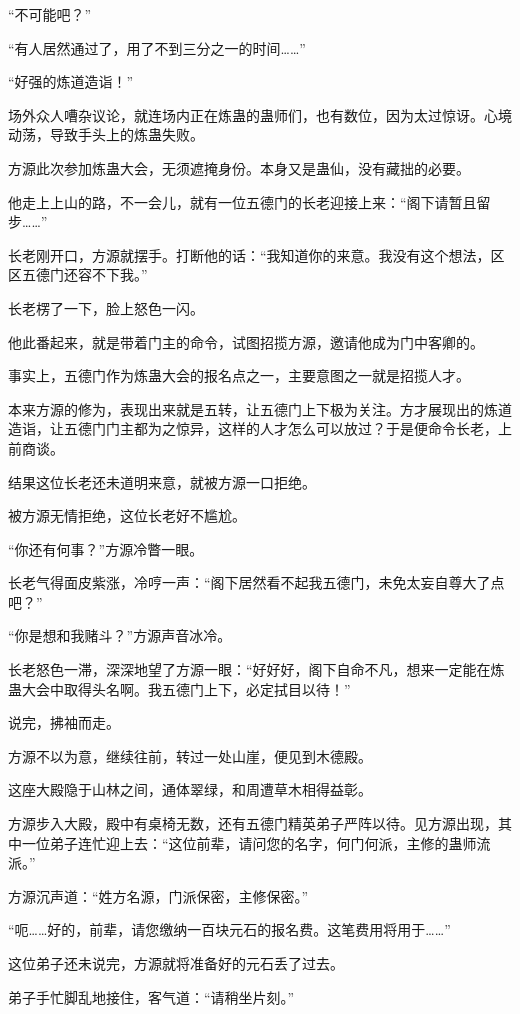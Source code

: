 \begin{this_body}
“不可能吧？”

“有人居然通过了，用了不到三分之一的时间……”

“好强的炼道造诣！”

场外众人嘈杂议论，就连场内正在炼蛊的蛊师们，也有数位，因为太过惊讶。心境动荡，导致手头上的炼蛊失败。

方源此次参加炼蛊大会，无须遮掩身份。本身又是蛊仙，没有藏拙的必要。

他走上上山的路，不一会儿，就有一位五德门的长老迎接上来：“阁下请暂且留步……”

长老刚开口，方源就摆手。打断他的话：“我知道你的来意。我没有这个想法，区区五德门还容不下我。”

长老楞了一下，脸上怒色一闪。

他此番起来，就是带着门主的命令，试图招揽方源，邀请他成为门中客卿的。

事实上，五德门作为炼蛊大会的报名点之一，主要意图之一就是招揽人才。

本来方源的修为，表现出来就是五转，让五德门上下极为关注。方才展现出的炼道造诣，让五德门门主都为之惊异，这样的人才怎么可以放过？于是便命令长老，上前商谈。

结果这位长老还未道明来意，就被方源一口拒绝。

被方源无情拒绝，这位长老好不尴尬。

“你还有何事？”方源冷瞥一眼。

长老气得面皮紫涨，冷哼一声：“阁下居然看不起我五德门，未免太妄自尊大了点吧？”

“你是想和我赌斗？”方源声音冰冷。

长老怒色一滞，深深地望了方源一眼：“好好好，阁下自命不凡，想来一定能在炼蛊大会中取得头名啊。我五德门上下，必定拭目以待！”

说完，拂袖而走。

方源不以为意，继续往前，转过一处山崖，便见到木德殿。

这座大殿隐于山林之间，通体翠绿，和周遭草木相得益彰。

方源步入大殿，殿中有桌椅无数，还有五德门精英弟子严阵以待。见方源出现，其中一位弟子连忙迎上去：“这位前辈，请问您的名字，何门何派，主修的蛊师流派。”

方源沉声道：“姓方名源，门派保密，主修保密。”

“呃……好的，前辈，请您缴纳一百块元石的报名费。这笔费用将用于……”

这位弟子还未说完，方源就将准备好的元石丢了过去。

弟子手忙脚乱地接住，客气道：“请稍坐片刻。”


\end{this_body}
